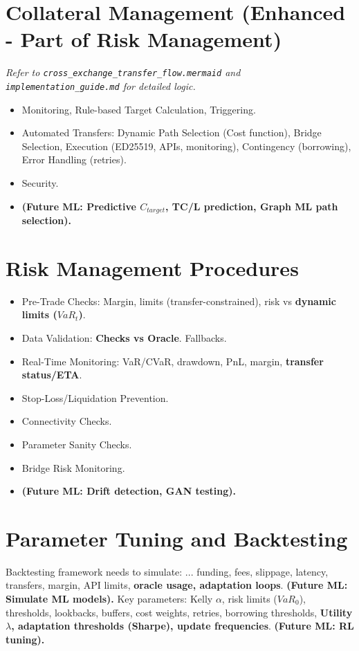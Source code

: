 \documentclass{article}
\begin{document}
\section{Collateral Management (Enhanced - Part of Risk Management)}
\textit{Refer to \texttt{cross\_exchange\_transfer\_flow.mermaid} and \texttt{implementation\_guide.md} for detailed logic.}
\begin{itemize}
    \item Monitoring, Rule-based Target Calculation, Triggering.
    \item Automated Transfers: Dynamic Path Selection (Cost function), Bridge Selection, Execution (ED25519, APIs, monitoring), Contingency (borrowing), Error Handling (retries).
    \item Security.
    \item \textbf{(Future ML: Predictive $C_{target}$, TC/L prediction, Graph ML path selection).}
\end{itemize}

\section{Risk Management Procedures}
\begin{itemize}
    \item Pre-Trade Checks: Margin, limits (transfer-constrained), risk vs \textbf{dynamic limits ($VaR_t$)}.
    \item Data Validation: \textbf{Checks vs Oracle}. Fallbacks.
    \item Real-Time Monitoring: VaR/CVaR, drawdown, PnL, margin, \textbf{transfer status/ETA}.
    \item Stop-Loss/Liquidation Prevention.
    \item Connectivity Checks.
    \item Parameter Sanity Checks.
    \item Bridge Risk Monitoring.
    \item \textbf{(Future ML: Drift detection, GAN testing).}
\end{itemize}

\section{Parameter Tuning and Backtesting}

Backtesting framework needs to simulate: ... funding, fees, slippage, latency, transfers, margin, API limits, \textbf{oracle usage, adaptation loops}. \textbf{(Future ML: Simulate ML models).}
Key parameters: Kelly $\alpha$, risk limits ($VaR_0$), thresholds, lookbacks, buffers, cost weights, retries, borrowing thresholds, \textbf{Utility $\lambda$, adaptation thresholds (Sharpe), update frequencies}. \textbf{(Future ML: RL tuning).}
\end{document}
